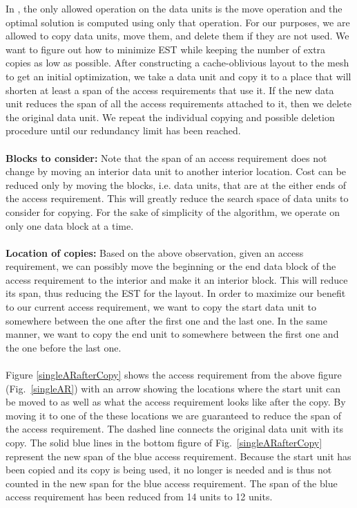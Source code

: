 In \cite{cacheobliviouslayout}, the only allowed operation on the data units is
the move operation and the optimal solution is computed using only that
operation. For our purposes, we are allowed to copy data units, move them, and
delete them if they are not used. We want to figure out how to minimize EST
while keeping the number of extra copies as low as possible. After constructing
a cache-oblivious layout to the mesh to get an initial optimization, we take a
data unit and copy it to a place that will shorten at least a span of the access
requirements that use it. If the new data unit reduces the span of all the
access requirements attached to it, then we delete the original data unit. We
repeat the individual copying and possible deletion procedure until our
redundancy limit has been reached. \\
\\
{\bf Blocks to consider:} Note that the span of an access requirement does not
change by moving an interior data unit to another interior location. Cost can
be reduced only by moving the blocks, i.e. data units, that are at the either ends of the access
requirement. This will greatly reduce the search space of data units to
consider for copying. For the sake of simplicity of the algorithm, we operate
on only one data block at a time. \\
\\
{\bf Location of copies:} Based on the above observation, given an access requirement, we can possibly move the beginning or the end data block of the access requirement to the interior and make it an interior block. This will reduce its span, thus reducing the EST for the layout. In order to maximize our benefit to our current access requirement, we want to copy the start data unit to somewhere between the one after the first one and the last one. In the same manner, we want to copy the end unit to somewhere between the first one and the one before the last one. \\
\\
Figure \ref{singleARafterCopy} shows the access requirement from the above figure (Fig.~\ref{singleAR}) with an arrow showing the locations where the start unit can be moved to as well as what the access requirement looks like after the copy. By moving it to one of the these locations we are guaranteed to reduce the span of the access requirement. The dashed line connects the original data unit with its copy. The solid blue lines in the bottom figure of Fig.~\ref{singleARafterCopy} represent the new span of the blue access requirement. Because the start unit has been copied and its copy is being used, it no longer is needed and is thus not counted in the new span for the blue access requirement. The span of the blue access requirement has been reduced from 14 units to 12 units.\\
